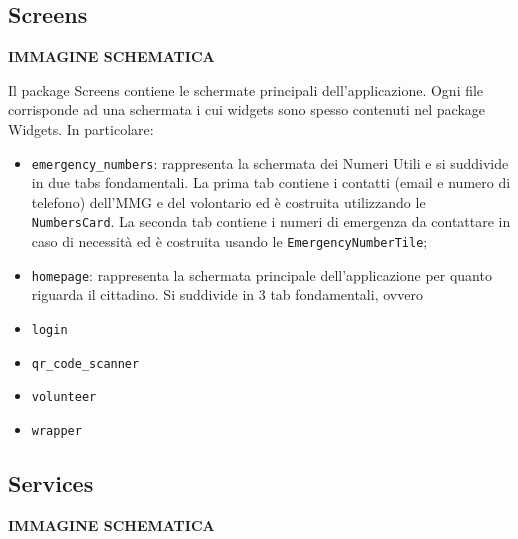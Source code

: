 \documentclass[12pt,a4paper,twoside,openright,titlepage]{book}
\begin{document}
\subsection{Screens}
\textbf{IMMAGINE SCHEMATICA}\newline

Il package Screens contiene le schermate principali dell'applicazione. Ogni file corrisponde ad una schermata i cui widgets sono spesso contenuti nel package Widgets. In particolare:
\begin{itemize}
\item \texttt{emergency\_numbers}: rappresenta la schermata dei Numeri Utili e si suddivide in due tabs fondamentali. La prima tab contiene i contatti (email e numero di telefono) dell'MMG e del volontario ed è costruita utilizzando le \texttt{NumbersCard}. La seconda tab contiene i numeri di emergenza da contattare in caso di necessità ed è costruita usando le \texttt{EmergencyNumberTile};
\item \texttt{homepage}: rappresenta la schermata principale dell'applicazione per quanto riguarda il cittadino. Si suddivide in 3 tab fondamentali, ovvero
\item \texttt{login}
\item \texttt{qr\_code\_scanner}
\item \texttt{volunteer}
\item \texttt{wrapper}
\end{itemize}

\subsection{Services}
\textbf{IMMAGINE SCHEMATICA}\newline
\end{document}

